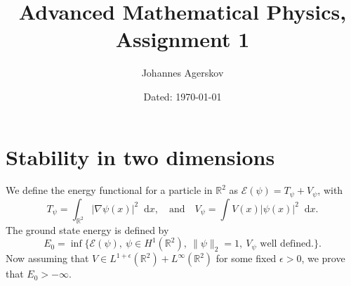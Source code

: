 \documentclass[a4paper,11pt]{article}
\author{Johannes Agerskov}
\date{Dated: \today}
\title{Advanced Mathematical Physics, Assignment 1}
\newcommand*\diff{\mathop{}\!\mathrm{d}}
\newcommand{\R}{\mathbb{R}}
\numberwithin{equation}{section}
\begin{document}
	\maketitle

\section{Stability in two dimensions}
We define the energy functional for a particle in $ \R^2 $ as $ \mathcal{E}(\psi)=T_\psi+V_\psi $, with \begin{equation}
T_\psi=\int_{\R^2}\lvert\nabla\psi(x)\rvert^2 \diff x,\quad\text{and}\quad V_\psi=\int V(x)\lvert\psi(x)\rvert^2 \diff x.
\end{equation}
The ground state energy is defined by\begin{equation}
E_0=\inf\{\mathcal{E}(\psi),\ \psi\in H^1(\R^2),\ \lVert\psi\rVert_2=1,\ V_\psi \text{ well defined.}\}.
\end{equation} 
Now assuming that $ V\in L^{1+\epsilon}(\R^2)+L^\infty(\R^2) $ for some fixed $ \epsilon>0 $, we prove that $ E_0>-\infty $.
\end{document}
